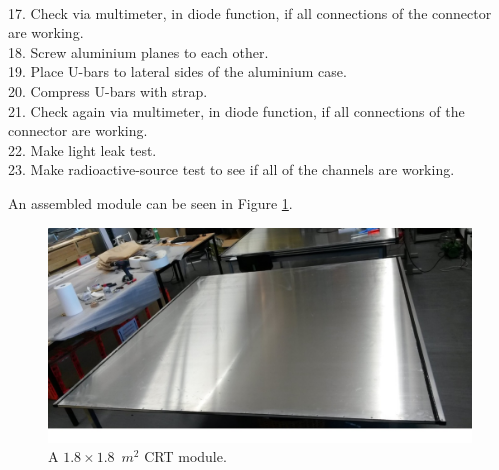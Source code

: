 \documentclass[a4paper]{article}\linespread{1.4}
\begin{document}
\\17.	Check via multimeter, in diode function, if all connections of the connector are working.
\\18.	Screw aluminium planes to each other.
\\19.	Place U-bars to lateral sides of the aluminium case.
\\20.	Compress U-bars with strap. 
\\21.	Check again via multimeter, in diode function, if all connections of the connector are working.
\\22.	Make light leak test.
\\23.	Make radioactive-source test to see if all of the channels are working. 

An assembled module can be seen in Figure \ref{fig:ass}.
\begin{figure}[h!] \hspace*{-0.5cm} \includegraphics[width=135mm,scale=2.0]{a1paint.jpg} \caption{A $1.8\times 1.8$~$m^{2}$ CRT module.} \label{fig:ass}\end{figure}



\end{document}
